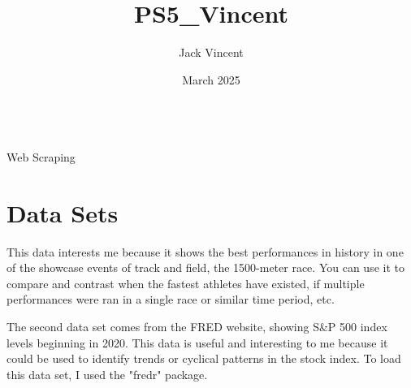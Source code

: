 \documentclass{article}
\title{PS5_Vincent}
\author{Jack Vincent}
\date{March 2025}
\begin{document}
\\Web Scraping 

\section{Data Sets}
This data interests me because it shows the best performances in history in one of the showcase events of track and field, the 1500-meter race. You can use it to compare and contrast when the fastest athletes have existed, if multiple performances were ran in a single race or similar time period, etc. 

The second data set comes from the FRED website, showing S\&P 500 index levels beginning in 2020. This data is useful and interesting to me because it could be used to identify trends or cyclical patterns in the stock index. To load this data set, I used the "fredr" package.
\end{document}
